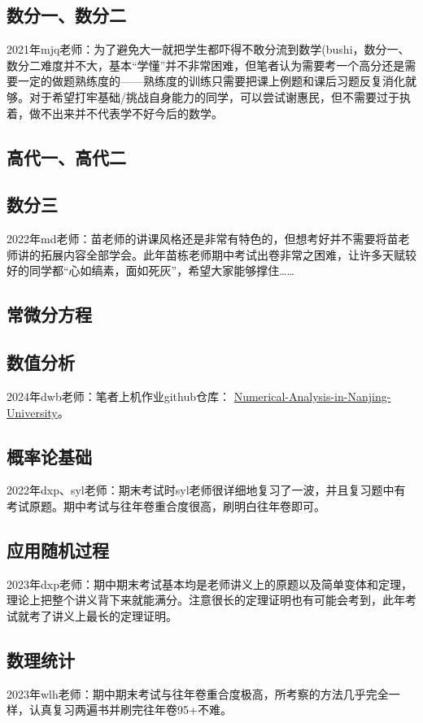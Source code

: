 \documentclass[a4paper,11pt,notitlepage]{article}
\begin{document}
\subsection{数分一、数分二}\label{数分一、数分二}
2021年mjq老师：为了避免大一就把学生都吓得不敢分流到数学(bushi，数分一、数分二难度并不大，基本“学懂”并不非常困难，但笔者认为需要考一个高分还是需要一定的做题熟练度的——熟练度的训练只需要把课上例题和课后习题反复消化就够。对于希望打牢基础/挑战自身能力的同学，可以尝试谢惠民，但不需要过于执着，做不出来并不代表学不好今后的数学。
\subsection{高代一、高代二}\label{高代一、高代二}

\subsection{数分三}
2022年md老师：苗老师的讲课风格还是非常有特色的，但想考好并不需要将苗老师讲的拓展内容全部学会。此年苗栋老师期中考试出卷非常之困难，让许多天赋较好的同学都“心如缟素，面如死灰”，希望大家能够撑住……

\subsection{常微分方程}\label{常微分方程}

\subsection{数值分析}
2024年dwb老师：笔者上机作业github仓库：
\href{https://github.com/Chenruishuo/Numerical-Analysis-in-Nanjing-University.git}{Numerical-Analysis-in-Nanjing-University}。

\subsection{概率论基础}\label{概率论基础}
2022年dxp、syl老师：期末考试时syl老师很详细地复习了一波，并且复习题中有考试原题。期中考试与往年卷重合度很高，刷明白往年卷即可。

\subsection{应用随机过程}\label{应用随机过程}
2023年dxp老师：期中期末考试基本均是老师讲义上的原题以及简单变体和定理，理论上把整个讲义背下来就能满分。注意很长的定理证明也有可能会考到，此年考试就考了讲义上最长的定理证明。
\subsection{数理统计}\label{数理统计}
2023年wlh老师：期中期末考试与往年卷重合度极高，所考察的方法几乎完全一样，认真复习两遍书并刷完往年卷95+不难。
\end{document}
